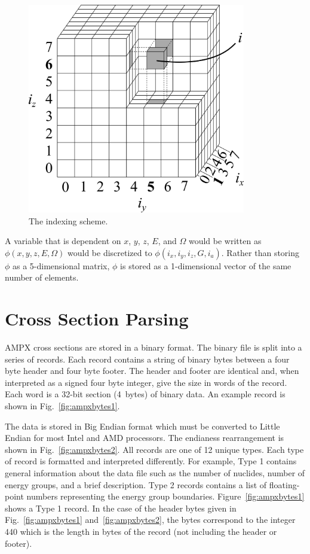 \begin{figure}[tb]
  \begin{center}
   \includegraphics[width=3.75in]{figs/indx_ex}
  \end{center}
  \caption{The indexing scheme.}
\label{fig:indx_ex}
\end{figure}

A variable that is dependent on $x$, $y$, $z$, $E$, and $\Omega$ would be written as $\phi(x, y, z, E, \Omega)$ would be discretized to $\phi(i_x, i_y, i_z, G, i_a)$. Rather than storing $\phi$ as a 5-dimensional matrix, $\phi$ is stored as a 1-dimensional vector of the same number of elements.

\section{Cross Section Parsing}\label{sec:xsparse}
AMPX cross sections are stored in a binary format. The binary file is split into a series of records. Each record contains a string of binary bytes between a four byte header and four byte footer. The header and footer are identical and, when interpreted as a signed four byte integer, give the size in words of the record. Each word is a 32-bit section (4~bytes) of binary data. An example record is shown in Fig.~\ref{fig:ampxbytes1}.

The data is stored in Big Endian format which must be converted to Little Endian for most Intel and AMD processors.  The endianess rearrangement is shown in Fig.~\ref{fig:ampxbytes2}. All records are one of 12 unique types. Each type of record is formatted and interpreted differently. For example, Type 1 contains general information about the data file such as the number of nuclides, number of energy groups, and a brief description. Type 2 records contains a list of floating-point numbers representing the energy group boundaries. Figure~\ref{fig:ampxbytes1} shows a Type 1 record. In the case of the header bytes given in Fig.~\ref{fig:ampxbytes1} and~\ref{fig:ampxbytes2}, the bytes correspond to the integer 440 which is the length in bytes of the record (not including the header or footer).


